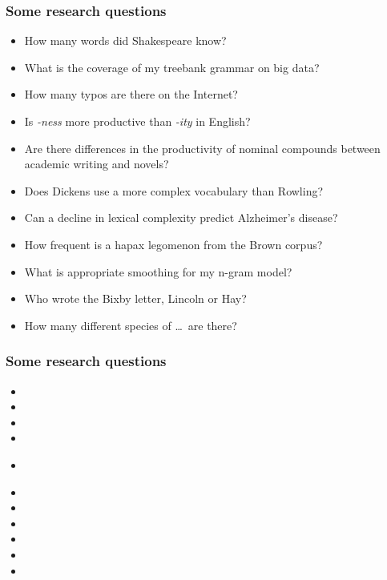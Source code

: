 \documentclass[t]{beamer} %
\begin{document}
\begin{frame}
  \frametitle{Some research questions}

  \begin{itemize}
  \item How many words did Shakespeare know?
  \item What is the coverage of my treebank grammar on big data?
  \item How many typos are there on the Internet?
  \item Is \emph{-ness} more productive than \emph{-ity} in English?
  \item Are there differences in the productivity of nominal compounds between academic writing and novels?
  \item Does Dickens use a more complex vocabulary than Rowling?
  \item Can a decline in lexical complexity predict Alzheimer's disease?
  \item How frequent is a hapax legomenon from the Brown corpus?
  \item What is appropriate smoothing for my n-gram model?
  \item Who wrote the Bixby letter, Lincoln or Hay?
  \item How many different species of \ldots\ are there? \citep{Brainerd:82}
  \end{itemize}
\end{frame}

\begin{frame}
  \frametitle{Some research questions}

  \begin{itemize}
  \item 
  \item {}
  \item
  \item
  \item {}\\\rule{0mm}{1ex}
  \item {}
  \item 
  \item {}
  \item 
  \item {}
  \item 
  \end{itemize}
\end{frame}
\end{document}

